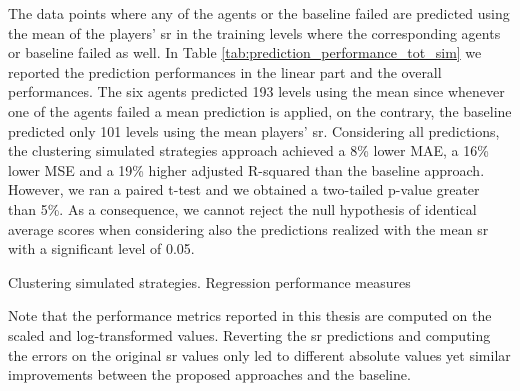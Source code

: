 The data points where any of the agents or the baseline failed are predicted using the mean of the players' \acs{sr} in the training levels where the corresponding agents or baseline failed as well.
In Table \ref{tab:prediction_performance_tot_sim} we reported the prediction performances in the linear part and the overall performances. The six agents predicted 193 levels using the mean since whenever one of the agents failed a mean prediction is applied, on the contrary, the baseline predicted only 101 levels using the mean players' \acs{sr}. Considering all predictions, the clustering simulated strategies approach achieved a 8\% lower MAE, a 16\% lower MSE and a 19\% higher adjusted R-squared than the baseline approach. However, we ran a paired t-test and we obtained a two-tailed p-value greater than 5\%. As a consequence, we cannot reject the null hypothesis of identical average scores when considering also the predictions realized with the mean \acs{sr} with a significant level of 0.05.

\begin{table}[h]
    \centering
    \small
    \caption{Clustering simulated strategies. Regression performance measures} 
    
    \label{tab:prediction_performance_tot_sim}
\end{table} 

Note that the performance metrics reported in this thesis are computed on the scaled and log-transformed values. Reverting the \acs{sr} predictions and computing the errors on the original \acs{sr} values only led to different absolute values yet similar improvements between the proposed approaches and the baseline.






